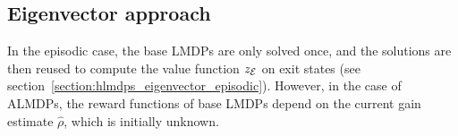 \subsection{Eigenvector approach}

In the episodic case, the base LMDPs are only solved once, and the solutions are then reused to compute the value function $z_{\mathcal{E}}$ on exit states (see section~\ref{section:hlmdps_eigenvector_episodic}). However, in the case of ALMDPs, the reward functions of base LMDPs depend on the current gain estimate $\widehat\rho$, which is initially unknown. 



